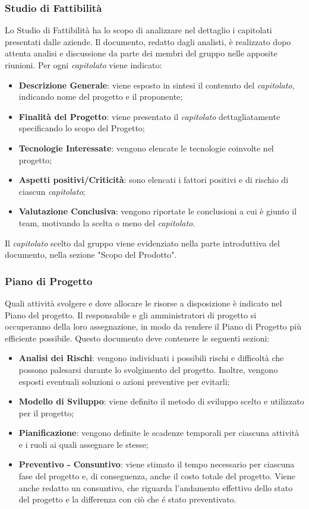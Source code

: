 \subsubsection{Studio di Fattibilità}
Lo Studio di Fattibilità ha lo scopo di analizzare nel dettaglio i capitolati presentati dalle aziende. Il documento,  redatto dagli analisti, è realizzato dopo attenta analisi e discussione da parte dei membri del gruppo nelle apposite riunioni. Per ogni \textit{capitolato\glo} viene indicato:
\begin{itemize}
  \item \textbf{Descrizione Generale}: viene esposto in sintesi il contenuto del \textit{capitolato\glos}, indicando nome del progetto e il proponente;
  \item \textbf{Finalità del Progetto}: viene presentato il \textit{capitolato\glo} dettagliatamente specificando lo scopo del Progetto;
  \item \textbf{Tecnologie Interessate}: vengono elencate le tecnologie coinvolte nel progetto;
  \item \textbf{Aspetti positivi/Criticità}: sono elencati i fattori positivi e di rischio di ciascun \textit{capitolato\glos};
  \item \textbf{Valutazione Conclusiva}: vengono riportate le conclusioni a cui è giunto il team, motivando la scelta o meno del \textit{capitolato\glos}.
\end{itemize}
Il \textit{capitolato\glo} scelto dal gruppo viene evidenziato nella parte introduttiva del documento, nella sezione "Scopo del Prodotto".
\subsubsection{Piano di Progetto}
Quali attività svolgere e dove allocare le risorse a disposizione è indicato nel Piano del progetto. Il responsabile e gli amministratori di progetto si occuperanno della loro assegnazione, in modo da rendere il Piano di Progetto più efficiente possibile. Questo documento deve contenere le seguenti sezioni:
\begin{itemize}
  \item \textbf{Analisi dei Rischi}: vengono individuati i possibili rischi e difficoltà che possono palesarsi durante lo svolgimento del progetto. Inoltre, vengono esposti eventuali soluzioni o azioni preventive per evitarli;
  \item \textbf{Modello di Sviluppo}: viene definito il metodo di sviluppo scelto e utilizzato per il progetto;
  \item \textbf{Pianificazione}: vengono definite le scadenze temporali per ciascuna attività e i ruoli ai quali assegnare le stesse;
  \item \textbf{Preventivo - Consuntivo}: viene stimato il tempo necessario per ciascuna fase del progetto e, di conseguenza, anche il costo totale del progetto. Viene anche redatto un consuntivo, che riguarda l'andamento effettivo dello stato del progetto e la differenza con ciò che é stato preventivato.
\end{itemize}
